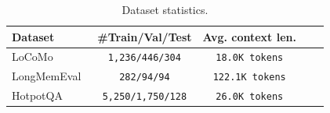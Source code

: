 \begin{table}[h]
\centering
\small
\caption{Dataset statistics.}
\label{tab:dataset_stats}
\begin{tabular}{lcccc}
\toprule
\textbf{Dataset} & \textbf{\#Train/Val/Test} & \textbf{Avg. context len.} \\
\midrule
LoCoMo~\cite{maharana2024evaluating-locomo}      & \texttt{1,236/446/304} & \texttt{18.0K tokens} \\
LongMemEval~\cite{wu2024longmemeval} & \texttt{282/94/94} & \texttt{122.1K tokens} \\
HotpotQA~\cite{yang2018hotpotqa, yu2025memagent}    & \texttt{5,250/1,750/128} & \texttt{26.0K tokens} \\
\bottomrule
\end{tabular}
\end{table}